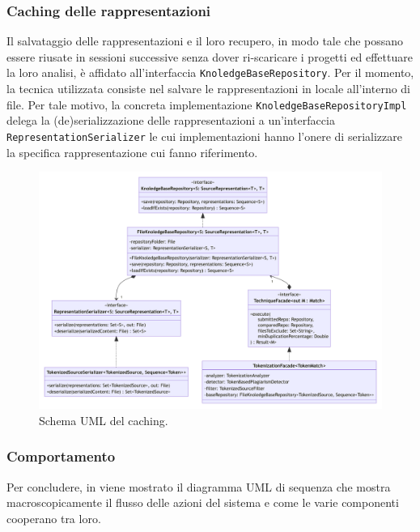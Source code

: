 \subsubsection*{Caching delle rappresentazioni}
Il salvataggio delle rappresentazioni e il loro recupero, in modo tale che possano essere riusate in sessioni successive senza dover ri-scaricare i progetti ed effettuare la loro analisi, è affidato all'interfaccia \texttt{KnoledgeBaseRepository}.
%
Per il momento, la tecnica utilizzata consiste nel salvare le rappresentazioni in locale all'interno di file.
%
Per tale motivo, la concreta implementazione \texttt{KnoledgeBaseRepositoryImpl} delega la (de)serializzazione delle rappresentazioni a un'interfaccia \texttt{RepresentationSerializer} le cui implementazioni hanno l'onere di serializzare la specifica rappresentazione cui fanno riferimento.

\begin{figure}
    \centering
    \includegraphics[width=\textwidth]{resources/img/02-cache.pdf}
    \caption{Schema UML del caching.}
    \label{img:02-caching}
\end{figure}

\subsubsection*{Comportamento}
Per concludere, in  viene mostrato il diagramma UML di sequenza che mostra macroscopicamente il flusso delle azioni del sistema e come le varie componenti cooperano tra loro.

